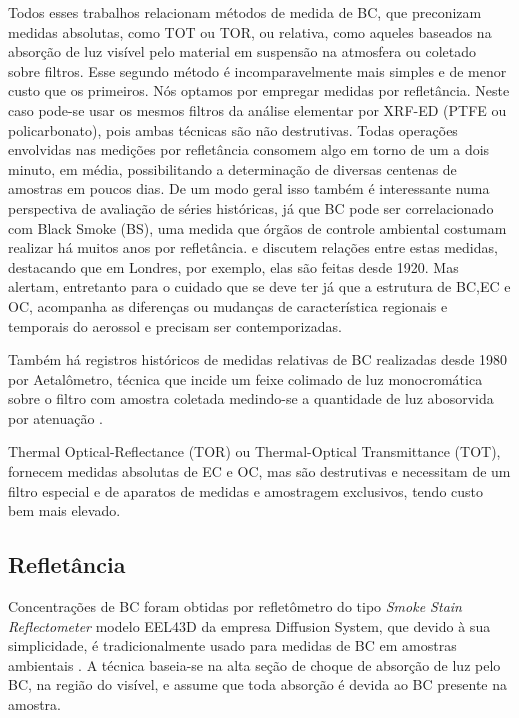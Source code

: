 Todos esses trabalhos relacionam métodos de medida de BC, que preconizam medidas
absolutas, como TOT ou TOR,  ou relativa, como aqueles baseados na absorção de 
luz visível pelo material em suspensão na atmosfera ou coletado sobre filtros. 
Esse segundo método é incomparavelmente mais simples e de menor custo que os 
primeiros. Nós optamos por empregar medidas por refletância. Neste caso pode-se 
usar os mesmos filtros da análise elementar por XRF-ED (PTFE ou policarbonato), 
pois ambas técnicas são não destrutivas. Todas operações envolvidas nas medições
por refletância consomem algo em torno de um a dois minuto, em média, 
possibilitando a determinação de diversas centenas de amostras em poucos dias.
De um modo geral isso também é interessante numa perspectiva de avaliação de 
séries históricas, já que BC pode ser correlacionado com Black Smoke (BS), 
uma medida que órgãos de controle ambiental costumam realizar há muitos anos 
por refletância. \citet{quincey2007} e \citet{heal2012} discutem relações entre 
estas medidas, destacando que em Londres, por exemplo, elas são feitas desde 
1920. Mas alertam, entretanto para o cuidado que se deve ter já que a estrutura 
de BC,EC e OC, acompanha as diferenças ou mudanças de característica regionais 
e temporais do aerossol e precisam ser contemporizadas.

Também há registros históricos de medidas relativas de BC realizadas desde 
1980 por Aetalômetro, técnica que incide um feixe colimado de luz monocromática 
sobre o filtro com amostra coletada medindo-se a quantidade de luz abosorvida
por atenuação \citep{targino2016}. 

Thermal Optical-Reflectance (TOR) ou Thermal-Optical Transmittance (TOT), 
fornecem medidas absolutas de EC e OC, mas são destrutivas e necessitam de um 
filtro especial e de aparatos de medidas e amostragem exclusivos, 
tendo custo bem mais elevado.

\subsection{Refletância}

Concentrações de BC foram obtidas por refletômetro do tipo 
\textit{Smoke Stain Reflectometer} modelo EEL43D da empresa Diffusion System, 
que devido à sua simplicidade, é tradicionalmente usado para medidas de BC em 
amostras ambientais \citep{lack2014}. A técnica baseia-se na alta seção 
de choque de absorção de luz pelo BC, na região do visível, e assume que 
toda absorção é devida ao BC presente na amostra.

